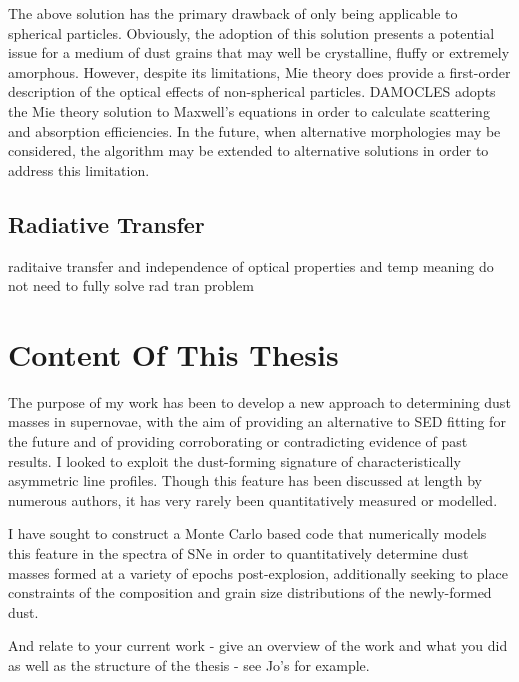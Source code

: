 The above solution has the primary drawback of only being applicable to spherical particles.  Obviously, the adoption of this solution presents a potential issue for a medium of dust grains that may well be crystalline, fluffy or extremely amorphous.  However, despite its limitations, Mie theory does provide a first-order description of the optical effects of non-spherical particles.  DAMOCLES adopts the Mie theory solution to Maxwell's equations in order to calculate scattering and absorption efficiencies.  In the future, when alternative morphologies may be considered, the algorithm may be extended to alternative solutions in order to address this limitation.




\subsection{Radiative Transfer}
raditaive transfer and independence of optical properties and temp meaning do not need to fully solve rad tran problem
 

\section{Content Of This Thesis}
The purpose of my work has been to develop a new approach to determining dust masses in supernovae, with the aim of providing an alternative to SED fitting for the future and of providing corroborating or contradicting evidence of past results.  I looked to exploit the dust-forming signature of characteristically asymmetric line profiles.  Though this feature has been discussed at length by numerous authors, it has very rarely been quantitatively measured or modelled.

I have sought to construct a Monte Carlo based code that numerically models this feature in the spectra of SNe in order to quantitatively determine dust masses formed at a variety of epochs post-explosion, additionally seeking to place constraints of the composition and grain size distributions of the newly-formed dust.

And relate to your current work - give an overview of the work and what you did as well as the structure of the thesis - see Jo's for example.
